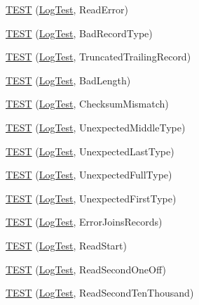 \begin{DoxyCompactItemize}
\item 
\hyperlink{namespaceleveldb_1_1log_a47ffd653cde9cb9bc00c0a9914da48fd}{T\+E\+S\+T} (\hyperlink{classleveldb_1_1log_1_1_log_test}{Log\+Test}, Read\+Error)
\item 
\hyperlink{namespaceleveldb_1_1log_a4fd335e6dbc3a27ea10e985387f69d6d}{T\+E\+S\+T} (\hyperlink{classleveldb_1_1log_1_1_log_test}{Log\+Test}, Bad\+Record\+Type)
\item 
\hyperlink{namespaceleveldb_1_1log_aab1ee21bc512e6a9415ee8170d14dfce}{T\+E\+S\+T} (\hyperlink{classleveldb_1_1log_1_1_log_test}{Log\+Test}, Truncated\+Trailing\+Record)
\item 
\hyperlink{namespaceleveldb_1_1log_a024a8bc0f558ffe46b3a15ab43018402}{T\+E\+S\+T} (\hyperlink{classleveldb_1_1log_1_1_log_test}{Log\+Test}, Bad\+Length)
\item 
\hyperlink{namespaceleveldb_1_1log_a2dccd9d88a61eb0f59fdea07edfe2022}{T\+E\+S\+T} (\hyperlink{classleveldb_1_1log_1_1_log_test}{Log\+Test}, Checksum\+Mismatch)
\item 
\hyperlink{namespaceleveldb_1_1log_ae2aa67608715051976e4cbb2008e3b52}{T\+E\+S\+T} (\hyperlink{classleveldb_1_1log_1_1_log_test}{Log\+Test}, Unexpected\+Middle\+Type)
\item 
\hyperlink{namespaceleveldb_1_1log_ad618b3ff1dc35a8641c019d8eb4a4e8b}{T\+E\+S\+T} (\hyperlink{classleveldb_1_1log_1_1_log_test}{Log\+Test}, Unexpected\+Last\+Type)
\item 
\hyperlink{namespaceleveldb_1_1log_a178460e2ee7a665f0aef08a28217a6d3}{T\+E\+S\+T} (\hyperlink{classleveldb_1_1log_1_1_log_test}{Log\+Test}, Unexpected\+Full\+Type)
\item 
\hyperlink{namespaceleveldb_1_1log_a7c8a46287bbb1e185ccfcb78c5ae94e3}{T\+E\+S\+T} (\hyperlink{classleveldb_1_1log_1_1_log_test}{Log\+Test}, Unexpected\+First\+Type)
\item 
\hyperlink{namespaceleveldb_1_1log_a2ea9cc0af9f5d8b6bdc74e3126bd389a}{T\+E\+S\+T} (\hyperlink{classleveldb_1_1log_1_1_log_test}{Log\+Test}, Error\+Joins\+Records)
\item 
\hyperlink{namespaceleveldb_1_1log_a6ee7068a33cb134e26e7d1cf58327064}{T\+E\+S\+T} (\hyperlink{classleveldb_1_1log_1_1_log_test}{Log\+Test}, Read\+Start)
\item 
\hyperlink{namespaceleveldb_1_1log_af9cc8dffe50b0cefff163fdca58d1a08}{T\+E\+S\+T} (\hyperlink{classleveldb_1_1log_1_1_log_test}{Log\+Test}, Read\+Second\+One\+Off)
\item 
\hyperlink{namespaceleveldb_1_1log_ab734bca6b78216dc41b112075258dbe7}{T\+E\+S\+T} (\hyperlink{classleveldb_1_1log_1_1_log_test}{Log\+Test}, Read\+Second\+Ten\+Thousand)

\end{DoxyCompactItemize}
